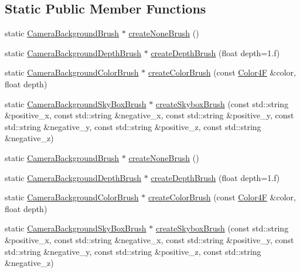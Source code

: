 \subsection*{Static Public Member Functions}
\begin{DoxyCompactItemize}
\item 
static \hyperlink{classCameraBackgroundBrush}{Camera\+Background\+Brush} $\ast$ \hyperlink{classCameraBackgroundBrush_abe7e4c281012b34fc0eab9d4d3b4ba65}{create\+None\+Brush} ()
\item 
static \hyperlink{classCameraBackgroundDepthBrush}{Camera\+Background\+Depth\+Brush} $\ast$ \hyperlink{classCameraBackgroundBrush_a32d485ee8c53bba234ca90c3db962fac}{create\+Depth\+Brush} (float depth=1.f)
\item 
static \hyperlink{classCameraBackgroundColorBrush}{Camera\+Background\+Color\+Brush} $\ast$ \hyperlink{classCameraBackgroundBrush_ab96c9c64b0a0cc6550b6252f6d4ffcb9}{create\+Color\+Brush} (const \hyperlink{structColor4F}{Color4F} \&color, float depth)
\item 
static \hyperlink{classCameraBackgroundSkyBoxBrush}{Camera\+Background\+Sky\+Box\+Brush} $\ast$ \hyperlink{classCameraBackgroundBrush_af15821dd65a75baa081ff185f99c20f9}{create\+Skybox\+Brush} (const std\+::string \&positive\+\_\+x, const std\+::string \&negative\+\_\+x, const std\+::string \&positive\+\_\+y, const std\+::string \&negative\+\_\+y, const std\+::string \&positive\+\_\+z, const std\+::string \&negative\+\_\+z)
\item 
static \hyperlink{classCameraBackgroundBrush}{Camera\+Background\+Brush} $\ast$ \hyperlink{classCameraBackgroundBrush_ae2b6946502a56aa52618255e1a18653b}{create\+None\+Brush} ()
\item 
static \hyperlink{classCameraBackgroundDepthBrush}{Camera\+Background\+Depth\+Brush} $\ast$ \hyperlink{classCameraBackgroundBrush_a79976e5b33d8880be95fac9376ed4b69}{create\+Depth\+Brush} (float depth=1.f)
\item 
static \hyperlink{classCameraBackgroundColorBrush}{Camera\+Background\+Color\+Brush} $\ast$ \hyperlink{classCameraBackgroundBrush_a95b4bf3f41a14015bbce424cc2f92952}{create\+Color\+Brush} (const \hyperlink{structColor4F}{Color4F} \&color, float depth)
\item 
static \hyperlink{classCameraBackgroundSkyBoxBrush}{Camera\+Background\+Sky\+Box\+Brush} $\ast$ \hyperlink{classCameraBackgroundBrush_a9140ee4a4b3a771bc82c6e85e2af8ea0}{create\+Skybox\+Brush} (const std\+::string \&positive\+\_\+x, const std\+::string \&negative\+\_\+x, const std\+::string \&positive\+\_\+y, const std\+::string \&negative\+\_\+y, const std\+::string \&positive\+\_\+z, const std\+::string \&negative\+\_\+z)
\end{DoxyCompactItemize}
